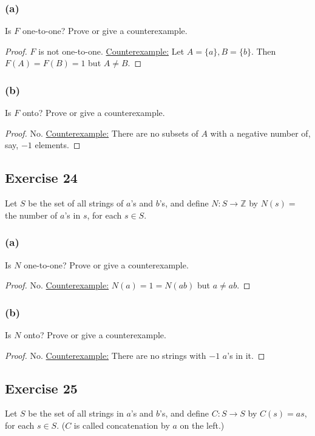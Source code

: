 \documentclass[14pt]{extarticle}
\newcommand{\Z}{\mathbb{Z}}
\begin{document}
\subsubsection{(a)}
Is $F$ one-to-one? Prove or give a counterexample.

\begin{proof}
    $F$ is not one-to-one. \underline{Counterexample:} Let \(A = \{a\}, B = \{b\}\). Then \(F(A) = F(B) = 1\) but \(A \neq B\).
\end{proof}

\subsubsection{(b)}
Is $F$ onto? Prove or give a counterexample.

\begin{proof}
    No. \underline{Counterexample:} There are no subsets of $A$ with a negative number of, say, $-1$ elements.
\end{proof}

\subsection{Exercise 24}
Let $S$ be the set of all strings of $a$’s and $b$’s, and define \(N: S \to \Z\) by \(N(s) =\) the number of $a$’s in
$s$, for each \(s \in S\).

\subsubsection{(a)}
Is $N$ one-to-one? Prove or give a counterexample.

\begin{proof}
    No. \underline{Counterexample:} $N(a) = 1 = N(ab)$ but $a \neq ab$.
\end{proof}

\subsubsection{(b)}
Is $N$ onto? Prove or give a counterexample.

\begin{proof}
    No. \underline{Counterexample:} There are no strings with $-1$ $a$'s in it.
\end{proof}

\subsection{Exercise 25}
Let $S$ be the set of all strings in $a$’s and $b$’s, and
define \(C: S \to S\) by \(C(s) = as\), for each $s \in S$.
($C$ is called concatenation by $a$ on the left.)
\end{document}
